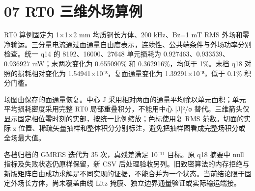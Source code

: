 \documentclass[11pt]{article}
\begin{document}
\section*{07 RT0 三维外场算例}
\hypertarget{chapter-07}{}
RT0 算例固定为 1×1×2 mm 均质铜长方体、200 kHz、Bz=1 mT RMS 外场和零净输运。三分量电流通过面通量自由度表示，连续性、公共端条件与外场功率分别检查。统一 q14 的 8192、16000、27648 单元损耗为 0.927463、0.933539、0.936927 mW；末两次变化为 0.655090\% 和 0.362916\%，均低于 1\%。末档 q18 对照的损耗相对变化为 1.54941×10⁻⁸，复面通量变化为 1.39291×10⁻⁸，低于 0.1\% 积分门槛。


场图由保存的面通量恢复。中心 J 采用相对两面的通量平均除以单元面积；单元平均损耗密度采用完整 RT0 局部重叠积分，不能用中心 |J|²/σ 替代。三维箭头仅显示固定相位零时刻的实部，按统一比例缩放；色标使用复 RMS 范数。切面的实际 z 位置、稀疏矢量抽样和整体积分分别标注，避免把抽样图看成完整场积分或全场最大值。


各档归档的 GMRES 迭代为 35 次，真残差满足 10⁻¹¹ 目标。原 q18 摘要中 null 指标及失败状态仍原样保留，新 CSV 后处理验收另列。旧致密算法的内存拒绝与新版矩阵自由成功求解是不同实现的证据，不能合并为一个状态。当前结论限于固定外场长方体，尚未覆盖曲线 Litz 掩膜、独立边界通量验证或实际输运端接。
\end{document}
